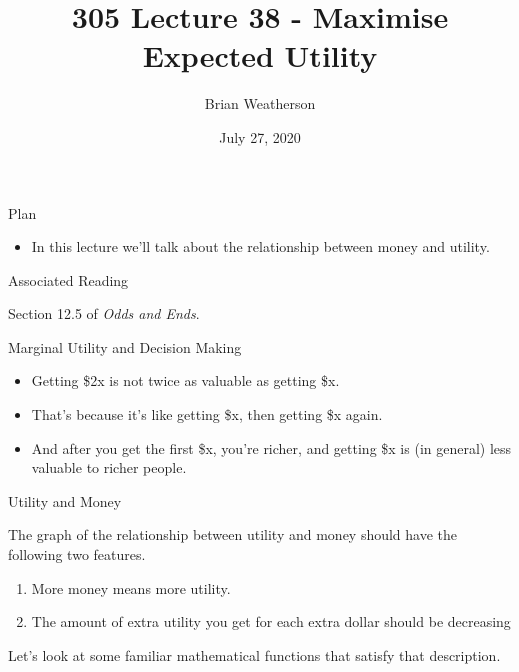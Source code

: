 \documentclass[
  ignorenonframetext,
]{beamer}
\title{305 Lecture 38 - Maximise Expected Utility}
\author{Brian Weatherson}
\date{July 27, 2020}
\providecommand{\tightlist}{%
  \setlength{\itemsep}{0pt}\setlength{\parskip}{0pt}}
\renewcommand{\,}{\text{, }}
\begin{document}
\frame{\titlepage}

\begin{frame}{Plan}
\protect\hypertarget{plan}{}

\begin{itemize}
\tightlist
\item
  In this lecture we'll talk about the relationship between money and
  utility.
\end{itemize}

\end{frame}

\begin{frame}{Associated Reading}
\protect\hypertarget{associated-reading}{}

Section 12.5 of \emph{Odds and Ends}.

\end{frame}

\begin{frame}{Marginal Utility and Decision Making}
\protect\hypertarget{marginal-utility-and-decision-making}{}

\begin{itemize}
\tightlist
\item
  Getting \$2x is not twice as valuable as getting \$x.
\item
  That's because it's like getting \$x, then getting \$x again.
\item
  And after you get the first \$x, you're richer, and getting \$x is (in
  general) less valuable to richer people.
\end{itemize}

\end{frame}

\begin{frame}{Utility and Money}
\protect\hypertarget{utility-and-money}{}

The graph of the relationship between utility and money should have the
following two features.

\begin{enumerate}
\tightlist
\item
  More money means more utility.
\item
  The amount of extra utility you get for each extra dollar should be
  decreasing
\end{enumerate}

Let's look at some familiar mathematical functions that satisfy that
description.

\end{frame}
\end{document}
